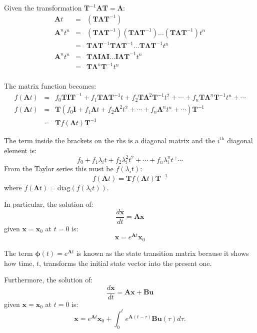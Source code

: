 Given the transformation $\mathbf{T}^{-1}\mathbf{AT}=\mathbf{\Lambda}$:
\begin{eqnarray*}
	\mathbf{A}t & = & (\mathbf{T\Lambda T}^{-1}) \\
	\mathbf{A}^nt^n & = & (\mathbf{T\Lambda T}^{-1})(\mathbf{T\Lambda T}^{-1})\ldots(\mathbf{T\Lambda T}^{-1})t^n \\
	                & = & \mathbf{T\Lambda T}^{-1}\mathbf{T\Lambda T}^{-1}\ldots\mathbf{T\Lambda T}^{-1}t^n \\
	\mathbf{A}^nt^n & = & \mathbf{T\Lambda}\mathbf{I}\mathbf{\Lambda I}\ldots\mathbf{I\Lambda T}^{-1}t^n \\
	\               & = & \mathbf{T\Lambda}^n\mathbf{T}^{-1}t^n \\
\end{eqnarray*}

 
The matrix function becomes:
\begin{eqnarray*}
	f(\mathbf{A}t) & = & f_0\mathbf{TIT}^{-1} + f_1\mathbf{T\Lambda T}^{-1}t + f_2\mathbf{T\Lambda}^2\mathbf{T}^{-1}t^2 + \cdots + f_n\mathbf{T\Lambda}^n\mathbf{T}^{-1}t^n + \cdots \\
	f(\mathbf{A}t) & = & \mathbf{T}\left(f_0\mathbf{I} + f_1\mathbf{\Lambda}t + f_2\mathbf{\Lambda}^2t^2 + \cdots + f_n\mathbf{\Lambda}^nt^n + \cdots \right)\mathbf{T}^{-1}\\
	               & = & \mathbf{T}f(\mathbf{\Lambda}t)\mathbf{T}^{-1}
\end{eqnarray*}
 
The term inside the brackets on the rhs is a diagonal matrix and the $i^\mathrm{th}$ diagonal element is:
\[
f_0+f_1\lambda_it + f_2\lambda_i^2t^2 + \cdots + f_n\lambda_i^nt^ + \cdots
\]
From the Taylor series this must be $f(\lambda_i t)$:
\[
f(\mathbf{A} t)=\mathbf{T} f(\mathbf{\Lambda} t) \mathbf{T}^{-1}
\]   
where $f(\mathbf{\Lambda} t)=\mathrm{diag}\left(f(\lambda_i t)\right)$.
 
In particular, the solution of:
\[
\frac{d\mathbf{x}}{dt}=\mathbf{Ax}
\]
given $\mathbf{x}=\mathbf{x}_0$ at $t=0$ is:
\[
\mathbf{x}=e^{\mathbf{A}t}\mathbf{x}_0
\]
               
The term  $\mathbf{\phi}(t) = e^{\mathbf{A}t}$  is known as the state transition matrix because it shows how time, $t$, transforms the initial state vector into the present one.

Furthermore, the solution of:
\[
\frac{d\mathbf{x}}{dt}=\mathbf{Ax} + \mathbf{Bu}
\]
given $\mathbf{x}=\mathbf{x}_0$ at $t=0$ is:
\[
\mathbf{x}=e^{\mathbf{A}t}\mathbf{x}_0 + \int_0^t e^{\mathbf{A}(t-\tau)}\mathbf{Bu}(\tau)d\tau.
\]

